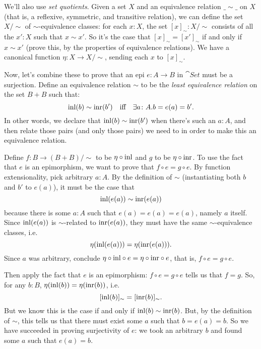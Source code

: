 \begin{Answer}
\begin{enumerate}
    We'll also use \emph{set quotients}. Given a set $X$ and an equivalence relation $\_\sim\_$ on $X$ (that is, a reflexive, symmetric, and transitive relation), we can define the set $X/\sim$ of $\sim$-equivalence classes: for each $x\colon X$, the set $[x]_\sim \colon X/\sim$ consists of all the $x'\colon X$ such that $x\sim x'$. So it's the case that $[x]_\sim = [x']_\sim$ if and only if $x\sim x'$ (prove this, by the properties of equivalence relations). We have a canonical function $\eta\colon X\to X/\sim$, sending each $x$ to $[x]_\sim$.

    Now, let's combine these to prove that an epi $e:A\to B$ in $\cat{Set}$ must be a surjection. Define an equivalence relation $\sim$ to be the \emph{least equivalence relation} on the set $B+B$ such that:
    \[ \mathrm{inl}(b) \sim \mathrm{inr}(b') \quad\text{iff}\quad \exists a\colon A. b=e(a)=b'. \]
    In other words, we declare that $\mathrm{inl}(b)\sim\mathrm{inr}(b')$ when there's such an $a\colon A$, and then relate those pairs (and only those pairs) we need to in order to make this an equivalence relation.
    
    Define $f:B\to (B+B)/\sim$ to be $\eta\circ\mathrm{inl}$ and $g$ to be $\eta\circ\mathrm{inr}$. To use the fact that $e$ is an epimorphism, we want to prove that $f\circ e = g\circ e$. By function extensionality, pick arbitrary $a\colon A$. By the definition of $\sim$ (instantiating both $b$ and $b'$ to $e(a)$), it must be the case that
    \[ \mathrm{inl}(e(a)) \sim \mathrm{inr}(e(a)) \]
    because there is some $a\colon A$ such that $e(a)=e(a)=e(a)$, namely $a$ itself. Since $\mathrm{inl}(e(a))$ is $\sim$-related to $\mathrm{inr}(e(a))$, they must have the same $\sim$-equivalence classes, i.e.
    \[ \eta(\mathrm{inl}(e(a))) = \eta(\mathrm{inr}(e(a))). \]
    Since $a$ was arbitrary, conclude $\eta\circ\mathrm{inl}\circ e = \eta\circ\mathrm{inr}\circ e$, that is, $f\circ e = g\circ e$. 
    
    Then apply the fact that $e$ is an epimorphism: $f\circ e = g\circ e$ tells us that $f=g$. So, for any $b\colon B$, $\eta(\mathrm{inl}(b))=\eta(\mathrm{inr}(b))$, i.e.
    \[ [\mathrm{inl}(b)]_\sim = [\mathrm{inr}(b)]_\sim. \]
    But we know this is the case if and only if $\mathrm{inl}(b)\sim\mathrm{inr}(b)$. But, by the definition of $\sim$, this tells us that there must exist some $a$ such that $b=e(a)=b$. So we have succeeded in proving surjectivity of $e$: we took an arbitrary $b$ and found some $a$ such that $e(a)=b$.
  \end{enumerate}
\end{Answer}

